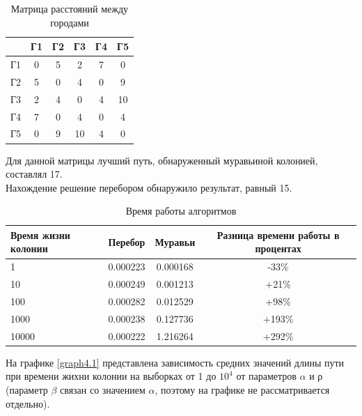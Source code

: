 \documentclass[../main.tex]{subfiles}
\begin{document}
	\begin{table}[ht]
		\caption{Матрица расстояний между городами}
		\begin{tabular}{|l|c|c|c|c|c|}
			\hline
			& Г1 & Г2 & Г3 & Г4 & Г5\\
			\hline
			\hline
			Г1 & 0 & 5 & 2  & 7 &  0\\
			\hline
			Г2 & 5 & 0 & 4 & 0 & 9\\
			\hline
			Г3 & 2 & 4 & 0 & 4 & 10\\
			\hline
			Г4 & 7 & 0 & 4 & 0 & 4\\
			\hline
			Г5 & 0 & 9 & 10 & 4 & 0\\
			\hline
		\end{tabular}
		\label{tab:tabular}
	\end{table}

	Для данной матрицы лучший путь, обнаруженный муравьиной колонией, составлял 17. \\
	
	Нахождение решение перебором обнаружило результат, равный 15.
	
	\begin{table}[H]
		\caption{Время работы алгоритмов}
		\begin{tabular}{|l|c|c|c|}
			\hline
			Время жизни колонии & Перебор & Муравьи & Разница времени работы в процентах\\
			\hline
			\hline
			1 & 0.000223 & 0.000168 & -33\%\\
			\hline
			10 & 0.000249 & 0.001213 & +21\%\\
			\hline
			100 & 0.000282 & 0.012529 & +98\%\\
			\hline
			1000 & 0.000238 & 0.127736 & +193\%\\
			\hline
			10000 & 0.000222 & 1.216264 & +292\%\\
			\hline
		\end{tabular}
		\label{tab:tabular}
	\end{table}

	На графике \ref{graph4.1} представлена зависимость средних значений длины пути при времени жихни колонии на выборках от 1 до $10^4$ от параметров $\alpha$ и ρ (параметр $\beta$ связан со значением $\alpha$, поэтому на графике не рассматривается отдельно).
	
\end{document}
